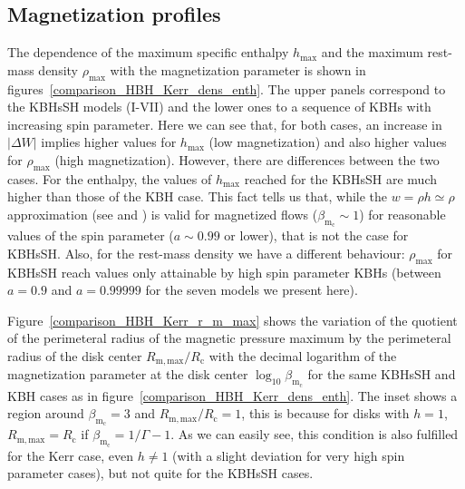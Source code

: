\documentclass[twocolumn,aps,showpacs,showkeys,prd,superscriptaddress,byrevtex, amsmath]{revtex4-1}
\begin{document}
\subsection{Magnetization profiles}

The dependence of the maximum specific enthalpy $h_{\mathrm{max}}$ and the maximum rest-mass density $\rho_{\mathrm{max}}$ with the magnetization parameter is shown in figures~\ref{comparison_HBH_Kerr_dens_enth}. The upper panels correspond to the KBHsSH models (I-VII) and the lower ones to a sequence of KBHs with increasing spin parameter.  Here we can see that, for both cases, an increase in $|\Delta W|$ implies higher values for $h_{\mathrm{max}}$ (low magnetization) and also higher values for $\rho_{\mathrm{max}}$ (high magnetization). However, there are differences between the two cases. For the enthalpy, the values of $h_{\mathrm{max}}$ reached for the KBHsSH are much higher than those of the KBH case. This fact tells us that, while the $w = \rho h \simeq \rho$ approximation (see \cite{Komissarov:2006} and \cite{Gimeno-Soler:2017}) is valid for magnetized flows ($\beta_{\mathrm{m_c}} \sim 1$) for reasonable values of the spin parameter ($a \sim 0.99$ or lower), that is not the case for KBHsSH. Also, for the rest-mass density we have a different behaviour: $\rho_{\mathrm{max}}$ for KBHsSH reach values only attainable by high spin parameter KBHs (between $a = 0.9$ and $a = 0.99999$ for the seven models we present here).

Figure~\ref{comparison_HBH_Kerr_r_m_max} shows the variation of the quotient of the perimeteral radius of the magnetic pressure maximum by the perimeteral radius of the disk center $R_{\mathrm{m, max}}/R_{\mathrm{c}}$ with the decimal logarithm of the magnetization parameter at the disk center $\log_{10} \beta_{\mathrm{m_c}}$ for the same KBHsSH and KBH cases as in figure~\ref{comparison_HBH_Kerr_dens_enth}. The inset shows a region around $\beta_{\mathrm{m_c}} = 3$ and $R_{\mathrm{m, max}}/R_{\mathrm{c}} = 1$, this is because for disks with $h = 1$, $R_{\mathrm{m, max}} = R_{\mathrm{c}}$ if $\beta_{\mathrm{m_c}} = 1 / \Gamma - 1$. As we can easily see, this condition is also fulfilled for the Kerr case, even $h \neq 1$ (with a slight deviation for very high spin parameter cases), but not quite for the KBHsSH cases. 
\end{document}
